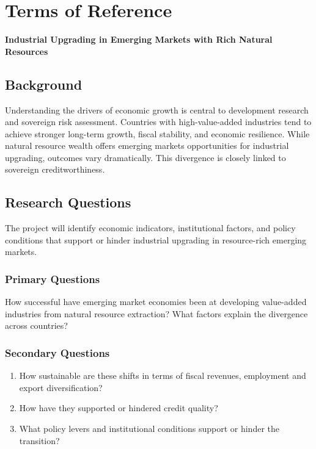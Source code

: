 \documentclass[12pt,a4paper]{report}
\begin{document}
\clearpage
\chapter*{Terms of Reference}

{\large \textbf{Industrial Upgrading in Emerging Markets with Rich Natural Resources}}

\section*{Background}

Understanding the drivers of economic growth is central to development research and sovereign risk assessment. Countries with high-value-added industries tend to achieve stronger long-term growth, fiscal stability, and economic resilience. While natural resource wealth offers emerging markets opportunities for industrial upgrading, outcomes vary dramatically. This divergence is closely linked to sovereign creditworthiness.

\section*{Research Questions}

The project will identify economic indicators, institutional factors, and policy conditions that support or hinder industrial upgrading in resource-rich emerging markets.

\subsection*{Primary Questions}

How successful have emerging market economies been at developing value-added industries from natural resource extraction? What factors explain the divergence across countries?

\subsection*{Secondary Questions}

\begin{enumerate}
\item How sustainable are these shifts in terms of fiscal revenues, employment and export diversification?
\item How have they supported or hindered credit quality?
\item What policy levers and institutional conditions support or hinder the transition?
\end{enumerate}
\end{document}
